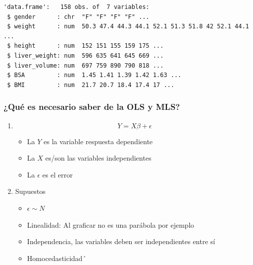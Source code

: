 \documentclass[
  letterpaper,
  DIV=11,
  numbers=noendperiod]{scrartcl}
\newenvironment{Shaded}{\begin{snugshade}}{\end{snugshade}}
\newcommand{\DecValTok}[1]{\textcolor[rgb]{0.68,0.00,0.00}{#1}}
\newcommand{\FloatTok}[1]{\textcolor[rgb]{0.68,0.00,0.00}{#1}}
\newcommand{\FunctionTok}[1]{\textcolor[rgb]{0.28,0.35,0.67}{#1}}
\newcommand{\NormalTok}[1]{\textcolor[rgb]{0.00,0.23,0.31}{#1}}
\newcommand{\OtherTok}[1]{\textcolor[rgb]{0.00,0.23,0.31}{#1}}
\newcommand{\SpecialCharTok}[1]{\textcolor[rgb]{0.37,0.37,0.37}{#1}}
\begin{document}
\begin{Shaded}
\end{Shaded}

\begin{verbatim}
'data.frame':   158 obs. of  7 variables:
 $ gender      : chr  "F" "F" "F" "F" ...
 $ weight      : num  50.3 47.4 44.3 44.1 52.1 51.3 51.8 42 52.1 44.1 ...
 $ height      : num  152 151 155 159 175 ...
 $ liver_weight: num  596 635 641 645 669 ...
 $ liver_volume: num  697 759 890 790 818 ...
 $ BSA         : num  1.45 1.41 1.39 1.42 1.63 ...
 $ BMI         : num  21.7 20.7 18.4 17.4 17 ...
\end{verbatim}

\hypertarget{quuxe9-es-necesario-saber-de-la-ols-y-mls}{%
\subsubsection{¿Qué es necesario saber de la OLS y
MLS?}\label{quuxe9-es-necesario-saber-de-la-ols-y-mls}}

\begin{enumerate}
\def\labelenumi{\arabic{enumi}.}
\item
  \[
  Y=X\beta+\epsilon
  \]

  \begin{itemize}
  \item
    La \(Y\) es la variable respuesta dependiente
  \item
    La \(X\) es/son las variables independientes
  \item
    La \(\epsilon\) es el error
  \end{itemize}
\item
  Supuestos

  \begin{itemize}
  \item
    \(\epsilon \sim N\)
  \item
    Linealidad: Al graficar no es una parábola por ejemplo
  \item
    Independencia, las variables deben ser independientes entre sí
  \item
    Homocedasticidad´
  \end{itemize}
\end{enumerate}
\end{document}
